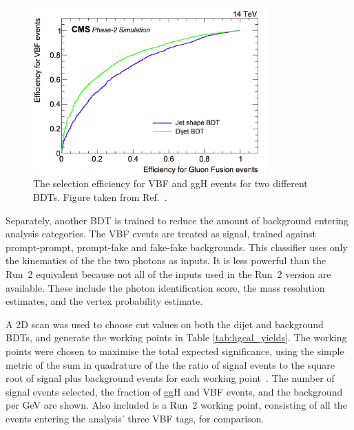 \begin{figure}[h!]
  \centering
  \includegraphics[width=0.8\textwidth]{Figures/HGCAL/VBFvsGGH.png}
  \caption[VBF and ggH selection efficiencies for two BDTs.]
  {
    The selection efficiency for VBF and ggH events for two different BDTs. 
    Figure taken from Ref.~\cite{HGCAL}.
  }
  \label{fig:hgcal_VBFvsGGH}
\end{figure}

Separately, another BDT is trained to reduce the amount of background entering analysis categories.
The VBF events are treated as signal, trained against prompt-prompt, prompt-fake and fake-fake \Hgg backgrounds.
This classifier uses only the kinematics of the the two photons as inputs. 
It is less powerful than the Run~2 equivalent because not all of the inputs used in the Run~2 version are available.
These include the photon identification score, the mass resolution estimates, and the vertex probability estimate.

A 2D scan was used to choose cut values on both the dijet and background BDTs, 
and generate the working points in Table \ref{tab:hgcal_yields}.
The working points were chosen to maximise the total expected significance, 
using the simple metric of the sum in quadrature of the 
the ratio of signal events to the square root of signal plus background events
for each working point~\cite{Cowan}.
The number of signal events selected, the fraction of ggH and VBF events, 
and the background per GeV are shown.
Also included is a Run~2 working point, 
consisting of all the events entering the analysis' three VBF tags, for comparison.

